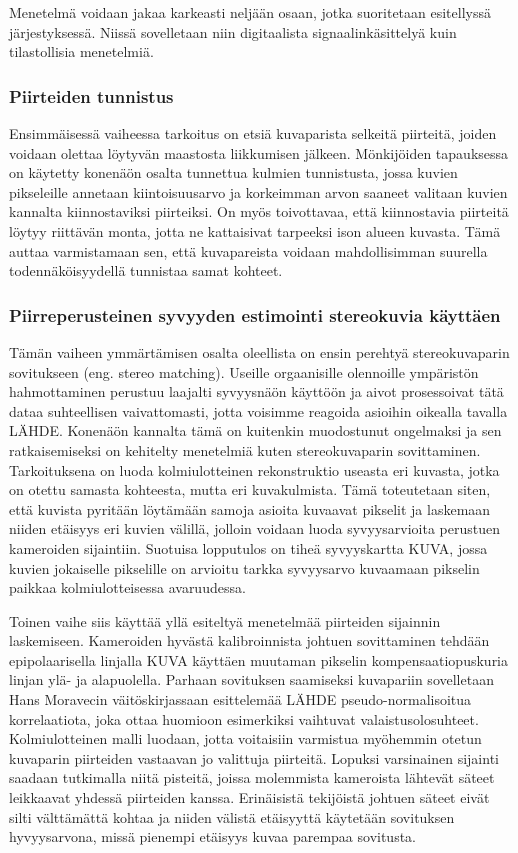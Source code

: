 \documentclass[finnish]{tktltiki2}
\theoremstyle{definition}
\theoremstyle{remark}
\begin{document}
Menetelmä voidaan jakaa karkeasti neljään osaan, jotka suoritetaan esitellyssä järjestyksessä. Niissä sovelletaan niin digitaalista signaalinkäsittelyä kuin tilastollisia menetelmiä.

\subsubsection{Piirteiden tunnistus}
Ensimmäisessä vaiheessa tarkoitus on etsiä kuvaparista selkeitä piirteitä, joiden voidaan olettaa löytyvän maastosta liikkumisen jälkeen. Mönkijöiden tapauksessa on käytetty konenäön osalta tunnettua kulmien tunnistusta, jossa kuvien pikseleille annetaan kiintoisuusarvo ja korkeimman arvon saaneet valitaan kuvien kannalta kiinnostaviksi piirteiksi. On myös toivottavaa, että kiinnostavia piirteitä löytyy riittävän monta, jotta ne kattaisivat tarpeeksi ison alueen kuvasta. Tämä auttaa varmistamaan sen, että kuvapareista voidaan mahdollisimman suurella todennäköisyydellä tunnistaa samat kohteet.

\subsubsection{Piirreperusteinen syvyyden estimointi stereokuvia käyttäen}
Tämän vaiheen ymmärtämisen osalta oleellista on ensin perehtyä stereokuvaparin sovitukseen (eng. stereo matching). Useille orgaanisille olennoille ympäristön hahmottaminen perustuu laajalti syvyysnäön käyttöön ja aivot prosessoivat tätä dataa suhteellisen vaivattomasti, jotta voisimme reagoida asioihin oikealla tavalla LÄHDE. Konenäön kannalta tämä on kuitenkin muodostunut ongelmaksi ja sen ratkaisemiseksi on kehitelty menetelmiä kuten stereokuvaparin sovittaminen. Tarkoituksena on luoda kolmiulotteinen rekonstruktio useasta eri kuvasta, jotka on otettu samasta kohteesta, mutta eri kuvakulmista. Tämä toteutetaan siten, että kuvista pyritään löytämään samoja asioita kuvaavat pikselit ja laskemaan niiden etäisyys eri kuvien välillä, jolloin voidaan luoda syvyysarvioita perustuen kameroiden sijaintiin. Suotuisa lopputulos on tiheä syvyyskartta KUVA, jossa kuvien jokaiselle pikselille on arvioitu tarkka syvyysarvo kuvaamaan pikselin paikkaa kolmiulotteisessa avaruudessa.

Toinen vaihe siis käyttää yllä esiteltyä menetelmää piirteiden sijainnin laskemiseen. Kameroiden hyvästä kalibroinnista johtuen sovittaminen tehdään epipolaarisella linjalla KUVA käyttäen muutaman pikselin kompensaatiopuskuria linjan ylä- ja alapuolella. Parhaan sovituksen saamiseksi kuvapariin sovelletaan Hans Moravecin väitöskirjassaan esittelemää LÄHDE pseudo-normalisoitua korrelaatiota, joka ottaa huomioon esimerkiksi vaihtuvat valaistusolosuhteet. Kolmiulotteinen malli luodaan, jotta voitaisiin varmistua myöhemmin otetun kuvaparin piirteiden vastaavan jo valittuja piirteitä. Lopuksi varsinainen sijainti saadaan tutkimalla niitä pisteitä, joissa molemmista kameroista lähtevät säteet leikkaavat yhdessä piirteiden kanssa. Erinäisistä tekijöistä johtuen säteet eivät silti välttämättä kohtaa ja niiden välistä etäisyyttä käytetään sovituksen hyvyysarvona, missä pienempi etäisyys kuvaa parempaa sovitusta.
\end{document}
